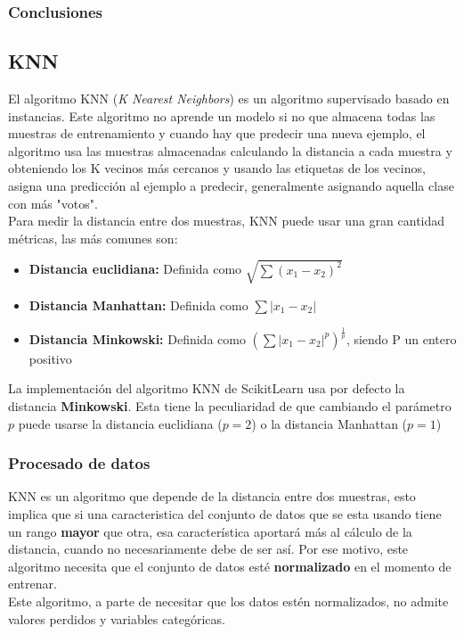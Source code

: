 \subsubsection{Conclusiones}
\pagebreak
\subsection{KNN}
\label{alg:knn}
El algoritmo  KNN (\textit{K Nearest Neighbors}) es un algoritmo supervisado basado en instancias. Este algoritmo no aprende un modelo si no que almacena todas las muestras de entrenamiento y cuando hay que predecir una nueva ejemplo, el algoritmo usa las muestras almacenadas calculando la distancia a cada muestra y obteniendo los K vecinos más cercanos y usando las etiquetas de los vecinos, asigna una predicción al ejemplo a predecir, generalmente asignando aquella clase con más "votos".\\
\linebreak
Para medir la distancia entre dos muestras, KNN puede usar una gran cantidad métricas, las más comunes son:
\begin{itemize}
	\item \textbf{Distancia euclidiana:} Definida como $\sqrt{\sum(x_1 - x_2)^2}$
	\item \textbf{Distancia Manhattan:} Definida como $\sum|x_1 - x_2|$
	\item  \textbf{Distancia Minkowski:} Definida como $(\sum|x_1 - x_2|^p)^{\frac{1}{p}}$, siendo P un entero positivo
\end{itemize}
La implementación del algoritmo KNN de ScikitLearn usa por defecto la distancia \textbf{Minkowski}. Esta tiene la peculiaridad de que cambiando el parámetro $p$ puede usarse la distancia euclidiana ($p=2$) o la distancia Manhattan ($p=1$)
\subsubsection{Procesado de datos}
KNN es un algoritmo que depende de la distancia entre dos muestras, esto implica que si una caracteristica del conjunto de datos que se esta usando tiene un rango \textbf{mayor} que otra, esa característica aportará más al cálculo de la distancia, cuando no necesariamente debe de ser así. Por ese motivo, este algoritmo necesita que el conjunto de datos esté \textbf{normalizado} en el momento de entrenar.\\
\linebreak
Este algoritmo, a parte de necesitar que los datos estén normalizados, no admite valores perdidos y variables categóricas.
